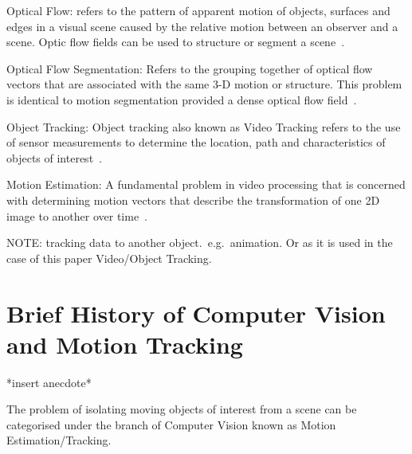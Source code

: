 Optical Flow: refers to the pattern of apparent motion of objects, surfaces and
edges in a visual scene caused by the relative motion between an observer and a
scene. Optic flow fields can be used to structure or segment a scene~\cite{Forsyth2012}.

Optical Flow Segmentation: Refers to the grouping together of optical flow
vectors that are associated with the same 3-D motion or structure. This problem
is identical to motion segmentation provided a dense optical flow field~\cite{Tekalp2014}.

Object Tracking: Object tracking also known as Video Tracking refers to the use
of sensor measurements to determine the location, path and characteristics of
objects of interest~\cite{Challa2011}.
 
Motion Estimation: A fundamental problem in video processing that is concerned
with determining motion vectors that describe the transformation of one 2D
image to another over time~\cite{Tekalp2014}.

NOTE:\@
tracking data to another object.\ e.g.\ animation. Or as it is used in the
case of this paper Video/Object Tracking.

\section{Brief History of Computer Vision and Motion Tracking}
*insert anecdote*

The problem of isolating moving objects of interest from a scene can
be categorised under the branch of Computer Vision known as Motion
Estimation/Tracking.

